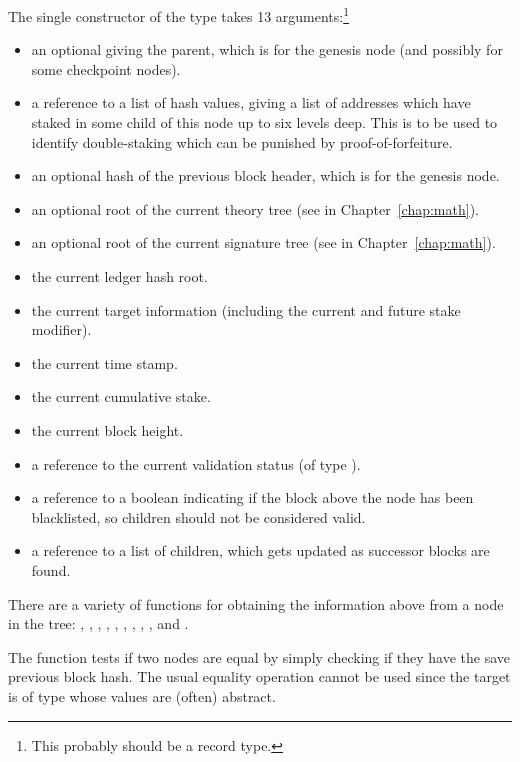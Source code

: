 The single constructor {} of the type {} takes 13 arguments:\footnote{This probably should be a record type.}
\begin{itemize}
\item an optional {} giving the parent, which is {} for the genesis node (and possibly for some checkpoint nodes).
\item a reference to a list of hash values, giving a list of addresses which have staked in some child of this node up to six levels deep. This is to be used to identify double-staking which can be punished by proof-of-forfeiture.
\item an optional hash of the previous block header, which is {} for the genesis node.
\item an optional root of the current theory tree (see {} in Chapter~\ref{chap:math}).
\item an optional root of the current signature tree (see {} in Chapter~\ref{chap:math}).
\item the current ledger hash root.
\item the current target information (including the current and future stake modifier).
\item the current time stamp.
\item the current cumulative stake.
\item the current block height.
\item a reference to the current validation status (of type {}).
\item a reference to a boolean indicating if the block above the node has been blacklisted, so children should not be considered valid.
\item a reference to a list of children, which gets updated as successor blocks are found.
\end{itemize}
There are a variety of functions for obtaining the information above from a node in the tree:
{},
{},
{},
{},
{},
{},
{},
{},
{},
{} and
{}.

The function {} tests if two nodes are equal by simply checking
if they have the save previous block hash.
The usual equality operation cannot be used since the target is of type {}
whose values are (often) abstract.

